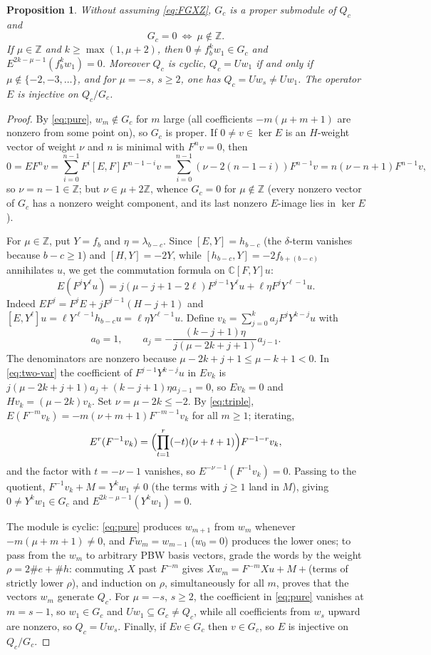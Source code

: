 \documentclass[11pt,a4paper]{article}
\newcommand{\C}{\mathbb C}
\newcommand{\Z}{\mathbb Z}
\newtheorem{proposition}[theorem]{Proposition}
\begin{document}
\begin{proposition}\label{prop:G}
Without assuming \eqref{eq:FGXZ}, $G_c$ is a proper submodule of $Q_c$ and
\[
 G_c=0\ \Longleftrightarrow\ \mu\notin\Z.
\]
If $\mu\in\Z$ and $k\ge\max(1,\mu+2)$, then
$0\ne f_b^kw_1\in G_c$ and $E^{2k-\mu-1}(f_b^kw_1)=0$. Moreover $Q_c$ is
cyclic, $Q_c=Uw_1$ if and only if $\mu\notin\{-2,-3,\ldots\}$, and for
$\mu=-s$, $s\ge2$, one has $Q_c=Uw_s\ne Uw_1$. The operator $E$ is
injective on $Q_c/G_c$.
\end{proposition}
\begin{proof}
By \eqref{eq:pure}, $w_m\notin G_c$ for $m$ large (all coefficients
$-m(\mu+m+1)$ are nonzero from some point on), so $G_c$ is proper. If
$0\ne v\in\ker E$ is an $H$-weight vector of weight $\nu$ and $n$ is
minimal with $F^nv=0$, then
\[
 0=EF^nv=\sum_{i=0}^{n-1}F^i[E,F]F^{n-1-i}v
 =\sum_{i=0}^{n-1}(\nu-2(n-1-i))F^{n-1}v
 =n(\nu-n+1)F^{n-1}v,
\]
so $\nu=n-1\in\Z$; but $\nu\in\mu+2\Z$, whence $G_c=0$ for
$\mu\notin\Z$ (every nonzero vector of $G_c$ has a nonzero weight
component, and its last nonzero $E$-image lies in $\ker E$).

For $\mu\in\Z$, put $Y=f_b$ and $\eta=\lambda_{b-c}$. Since
$[E,Y]=h_{b-c}$ (the $\delta$-term vanishes because $b-c\ge1$) and
$[H,Y]=-2Y$, while $[h_{b-c},Y]=-2f_{b+(b-c)}$ annihilates $u$, we get the
commutation formula on $\C[F,Y]u$:
\begin{equation}\label{eq:two-var}
 E(F^jY^\ell u)=j(\mu-j+1-2\ell)F^{j-1}Y^\ell u
 +\ell\eta F^jY^{\ell-1}u.
\end{equation}
Indeed $EF^j=F^jE+jF^{j-1}(H-j+1)$ and
$[E,Y^\ell]u=\ell Y^{\ell-1}h_{b-c}u=\ell\eta Y^{\ell-1}u$. Define
$v_k=\sum_{j=0}^{k}a_jF^jY^{k-j}u$ with
\begin{equation}\label{eq:vk}
 a_0=1,\qquad a_j=-\frac{(k-j+1)\eta}{j(\mu-2k+j+1)}a_{j-1}.
\end{equation}
The denominators are nonzero because $\mu-2k+j+1\le\mu-k+1<0$. In
\eqref{eq:two-var} the coefficient of $F^{j-1}Y^{k-j}u$ in $Ev_k$ is
$j(\mu-2k+j+1)a_j+(k-j+1)\eta a_{j-1}=0$, so $Ev_k=0$ and
$Hv_k=(\mu-2k)v_k$. Set $\nu=\mu-2k\le-2$. By \eqref{eq:triple},
$E(F^{-m}v_k)=-m(\nu+m+1)F^{-m-1}v_k$ for all $m\ge1$; iterating,
\[
 E^r(F^{-1}v_k)=\Bigl(\prod_{t=1}^{r}(-t)(\nu+t+1)\Bigr)F^{-1-r}v_k,
\]
and the factor with $t=-\nu-1$ vanishes, so
$E^{-\nu-1}(F^{-1}v_k)=0$. Passing to the quotient,
$F^{-1}v_k+M=Y^kw_1\ne0$ (the terms with $j\ge1$ land in $M$), giving
$0\ne Y^kw_1\in G_c$ and $E^{2k-\mu-1}(Y^kw_1)=0$.

The module is cyclic: \eqref{eq:pure} produces $w_{m+1}$ from $w_m$ whenever
$-m(\mu+m+1)\ne0$, and $Fw_m=w_{m-1}$ ($w_0=0$) produces the lower ones;
to pass from the $w_m$ to arbitrary PBW basis vectors, grade the words by
the weight $\rho=2\#e+\#h$: commuting $X$ past $F^{-m}$ gives
$Xw_m=F^{-m}Xu+M+$(terms of strictly lower $\rho$), and induction on
$\rho$, simultaneously for all $m$, proves that the vectors $w_m$ generate
$Q_c$. For $\mu=-s$, $s\ge2$, the coefficient in \eqref{eq:pure}
vanishes at $m=s-1$, so $w_1\in G_c$ and $Uw_1\subseteq G_c\ne Q_c$,
while all coefficients from $w_s$ upward are nonzero, so $Q_c=Uw_s$.
Finally, if $Ev\in G_c$ then $v\in G_c$, so $E$ is injective on
$Q_c/G_c$.
\end{proof}
\end{document}
